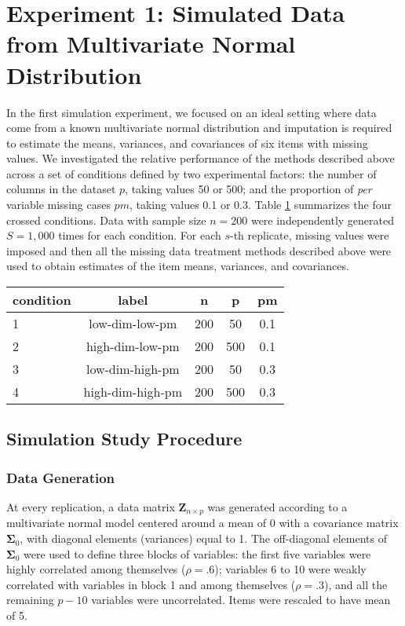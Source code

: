 \section{Experiment 1: Simulated Data from Multivariate Normal Distribution}

	In the first simulation experiment, we focused on an ideal setting where data come from a known multivariate normal 
	distribution and imputation is required to estimate the means, variances, and covariances of six items with 
	missing values.
	We investigated the relative performance of the methods described above across a set of conditions defined by two 
	experimental factors: the number of columns in the dataset $p$, taking values 50 or 500; 
	and the proportion of \emph{per} variable missing cases $pm$, taking values 0.1 or 0.3.
	Table \ref{tab:condExp1} summarizes the four crossed conditions.
	Data with sample size $n=200$ were independently generated $S = 1,000$ times for each condition.
	For each $s$-th replicate, missing values were imposed and then all the missing data treatment methods described above
	were used to obtain estimates of the item means, variances, and covariances.

\begin{table}
	{
	\begin{tabular}{l c c c c } 
		\toprule
		condition & label & n & p & pm \\
		\midrule
		1 & low-dim-low-pm   & 200 & 50  & 0.1 \\
		2 & high-dim-low-pm  & 200 & 500 & 0.1 \\
		3 & low-dim-high-pm  & 200 & 50  & 0.3 \\
		4 & high-dim-high-pm & 200 & 500 & 0.3 \\
		\bottomrule
	\end{tabular}
	}
\label{tab:condExp1}
\end{table}


\subsection{Simulation Study Procedure}

\subsubsection{Data Generation}
	At every replication, a data matrix $\bm{Z}_{n \times p}$ was generated according to a multivariate normal model 
	centered around a mean of 0 with a covariance matrix $\bm{\Sigma}_0$, with diagonal elements (variances) equal to 1.
	The off-diagonal elements of $\bm{\Sigma}_0$ were used to define three blocks of variables: 
	the first five variables were highly correlated among themselves ($\rho = .6$);
	variables 6 to 10 were weakly correlated with variables in block 1 and among themselves ($\rho = .3$), 
	and all the remaining $p-10$ variables were uncorrelated.
	Items were rescaled to have mean of 5.

